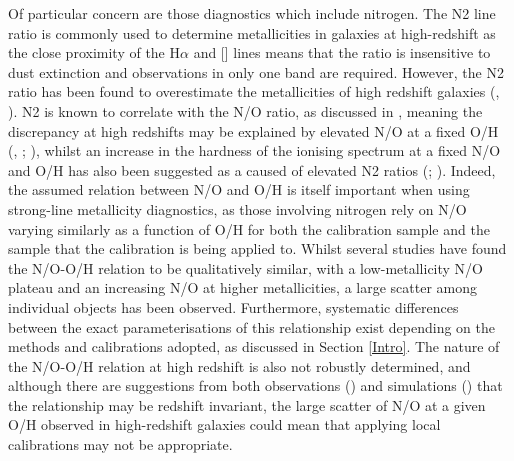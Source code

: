 \documentclass[usenatbib]{mnras} %
\begin{document}
Of particular concern are those diagnostics which include nitrogen. The N2 line ratio is commonly used to determine metallicities in galaxies at high-redshift as the close proximity of the H$\alpha$ and [] lines means that the ratio is insensitive to dust extinction and observations in only one band are required. However, the N2 ratio has been found to overestimate the metallicities of high redshift galaxies (\citealt{Liu_2008}, \citealt{Newman_2014}). N2 is known to correlate with the N/O ratio, as discussed in \cite{PMC_2009}, meaning the discrepancy at high redshifts may be explained by elevated N/O at a fixed O/H (\citealt{Masters_2014}, \citeyear{Masters_2016}; \citealt{Shapley_2015}), whilst an increase in the hardness of the ionising spectrum at a fixed N/O and O/H has also been suggested as a caused of elevated N2 ratios (\citealt{Steidel_2016}; \citealt{Strom_2017}). Indeed, the assumed relation between N/O and O/H is itself important when using strong-line metallicity diagnostics, as those involving nitrogen rely on N/O varying similarly as a function of O/H for both the calibration sample and the sample that the calibration is being applied to. Whilst several studies have found the N/O-O/H relation to be qualitatively similar, with a low-metallicity N/O plateau and an increasing N/O at higher metallicities, a large scatter among individual objects has been observed. Furthermore, systematic differences between the exact parameterisations of this relationship exist depending on the methods and calibrations adopted, as discussed in Section \ref{Intro}. The nature of the N/O-O/H relation at high redshift is also not robustly determined, and although there are suggestions from both observations (\citealt{Strom_2018}) and simulations (\citealt{V_K_2018}) that the relationship may be redshift invariant, the large scatter of N/O at a given O/H observed in high-redshift galaxies could mean that applying local calibrations may not be appropriate. 
\end{document}
